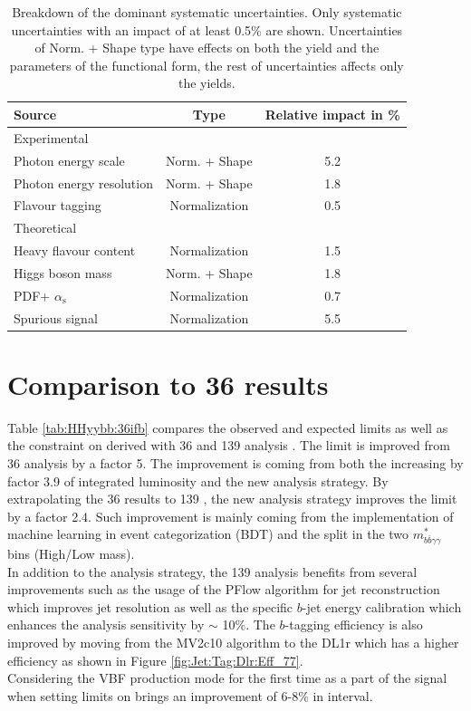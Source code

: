 \begin{table}[htbp]
    \centering
    \begin{tabular}{lcc}
\hline \hline 
Source & Type & Relative impact in \%  \\
\hline Experimental & & \\
\hline Photon energy scale & Norm. + Shape & 5.2  \\
Photon energy resolution & Norm. + Shape & 1.8  \\
Flavour tagging & Normalization & 0.5  \\
\hline Theoretical & & \\
\hline Heavy flavour content & Normalization & 1.5  \\
Higgs boson mass & Norm. + Shape & 1.8  \\
PDF+ $\alpha_{\mathrm{s}}$ & Normalization & 0.7  \\
\hline Spurious signal & Normalization & 5.5 \\
\hline \hline
\end{tabular}
    \caption{Breakdown of the dominant systematic uncertainties. Only systematic uncertainties with an impact of at least 0.5\% are shown. Uncertainties of Norm. + Shape type have effects on both the yield and the parameters of the functional form, the rest of uncertainties affects only the yields.}
    \label{tab:HHyybb:Results:Xsec:Sys}
\end{table}

\section{Comparison to 36 \ifb results}
\label{HHyybb:36ifb}
Table \ref{tab:HHyybb:36ifb} compares the observed and expected limits as well as the constraint on \kl derived with 36 \ifb and 139 \ifb analysis \cite{yybb_36ifb, yybb_139}. The limit is improved from 36 \ifb analysis by a factor 5. The improvement is coming from both the increasing by factor 3.9 of integrated luminosity and the new analysis strategy. By extrapolating the 36 \ifb results to 139 \ifb, the new analysis strategy improves the limit by a factor 2.4. Such improvement is mainly coming from the implementation of machine learning in event categorization (BDT) and the split in the two $m_{b\bar{b}\gamma\gamma}^*$ bins (High/Low mass).\\
In addition to the analysis strategy, the 139 \ifb analysis benefits from several improvements such as the usage of the PFlow algorithm for jet reconstruction which improves jet resolution as well as the specific $b$-jet energy calibration which enhances the analysis sensitivity by $\sim$ 10\%. The $b$-tagging efficiency is also improved by moving from the MV2c10 algorithm to the DL1r which has a higher efficiency as shown in Figure \ref{fig:Jet:Tag:Dlr:Eff_77}. \\
Considering the VBF production mode for the first time as a part of the signal when setting limits on \kl brings an improvement of 6-8\% in \kl interval. 

